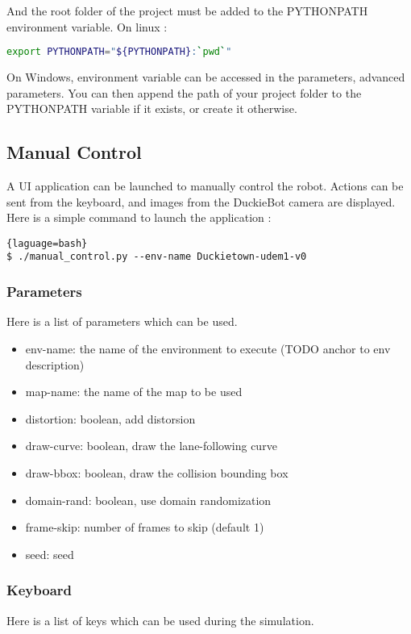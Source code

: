 \documentclass[12pt]{article}
\begin{document}
And the root folder of the project must be added to the PYTHONPATH environment variable.
On linux :
\begin{lstlisting}[language=bash]
    export PYTHONPATH="${PYTHONPATH}:`pwd`"
\end{lstlisting}

On Windows, environment variable can be accessed in the parameters,  advanced parameters. You can then append the path of your project folder to the PYTHONPATH variable if it exists, or create it otherwise.


\subsection{Manual Control}
A UI application can be launched to manually control the robot. Actions can be sent from the keyboard, and images from the DuckieBot camera are displayed. Here is a simple command to launch the application :

\begin{lstlisting}{laguage=bash}
$ ./manual_control.py --env-name Duckietown-udem1-v0
\end{lstlisting}

\subsubsection{Parameters}
Here is a list of parameters which can be used. 

\begin{itemize}
	\item env-name: the name of the environment to execute (TODO anchor to env description)
	\item map-name: the name of the map to be used
	\item distortion: boolean, add distorsion
	\item draw-curve: boolean, draw the lane-following curve
	\item draw-bbox: boolean, draw the collision bounding box
	\item domain-rand: boolean, use domain randomization
	\item frame-skip: number of frames to skip (default 1)
	\item seed: seed
\end{itemize}

\subsubsection{Keyboard}
Here is a list of keys which can be used during the simulation.
\end{document}
